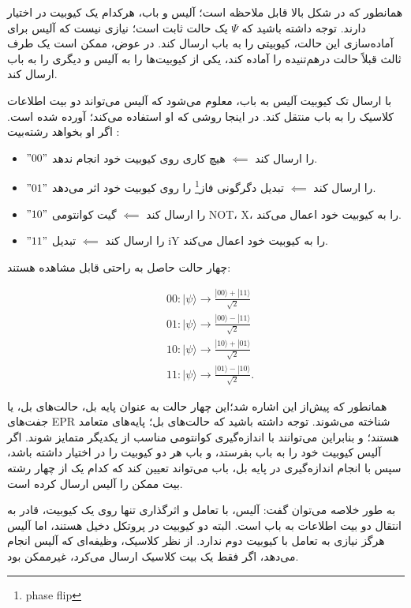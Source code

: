 \documentclass{book}
\begin{document}
همانطور که در شکل بالا قابل ملاحظه است؛ آلیس و باب، هرکدام یک کیوبیت در اختیار دارند. توجه داشته باشید که $\Psi$ یک حالت ثابت است؛ نیازی نیست که آلیس برای آماده‌سازی این حالت، کیوبیتی را به باب ارسال کند. در عوض، ممکن است یک طرف ثالث قبلاً حالت درهم‌تنیده را آماده کند، یکی از کیوبیت‌ها را به آلیس و دیگری را به باب ارسال کند.

با ارسال تک کیوبیت آلیس  به باب، معلوم می‌شود که آلیس می‌تواند دو بیت اطلاعات کلاسیک را به باب منتقل کند. در اینجا روشی که او استفاده می‌کند؛ آورده شده است. اگر او بخواهد رشته‌بیت :

\begin{itemize}
	\item  $"00"$ را ارسال کند $\impliedby$ هیچ کاری روی کیوبیت خود انجام ندهد.
	\item $"01"$ را ارسال کند $\impliedby$ تبدیل دگرگونی فاز\footnote{phase flip} را روی کیوبیت خود اثر می‌دهد.
	\item  $"10"$ را ارسال کند $\impliedby$ گیت کوانتومی NOT، X، را به کیوبیت خود اعمال می‌کند.
	\item  $"11"$ را ارسال کند $\impliedby$ تبدیل iY را به کیوبیت خود اعمال می‌کند.
\end{itemize}
چهار حالت حاصل به راحتی قابل مشاهده هستند:
\begin{center}
$$\begin{aligned}
	& 00:|\psi\rangle \rightarrow \frac{|00\rangle+|11\rangle}{\sqrt{2}} \\
	& 01:|\psi\rangle \rightarrow \frac{|00\rangle-|11\rangle}{\sqrt{2}} \\
	& 10:|\psi\rangle \rightarrow \frac{|10\rangle+|01\rangle}{\sqrt{2}} \\
	& 11:|\psi\rangle \rightarrow \frac{|01\rangle-|10\rangle}{\sqrt{2}} .
\end{aligned}$$	
\end{center}

همانطور که پیش‌از این اشاره شد؛این چهار حالت به عنوان پایه بل، حالت‌های بل، یا جفت‌های EPR شناخته می‌شوند.
 توجه داشته باشید که حالت‌های بل؛ پایه‌های متعامد هستند؛ و بنابراین می‌توانند با اندازه‌گیری کوانتومی مناسب از یکدیگر متمایز شوند. اگر آلیس کیوبیت خود را به باب بفرستد، و باب هر دو کیوبیت را در اختیار داشته باشد، سپس با انجام اندازه‌گیری در پایه بل، باب می‌تواند تعیین کند که کدام یک از چهار رشته بیت ممکن را آلیس ارسال کرده است.

به طور خلاصه می‌توان گفت:
 آلیس، با تعامل و اثرگذاری تنها روی یک کیوبیت، قادر به انتقال دو بیت اطلاعات به باب است. البته دو کیوبیت در پروتکل دخیل هستند، اما آلیس هرگز نیازی به تعامل با کیوبیت دوم ندارد. از نظر کلاسیک، وظیفه‌ای که آلیس انجام می‌دهد، اگر فقط یک بیت کلاسیک ارسال می‌کرد، غیرممکن بود.
\end{document}

